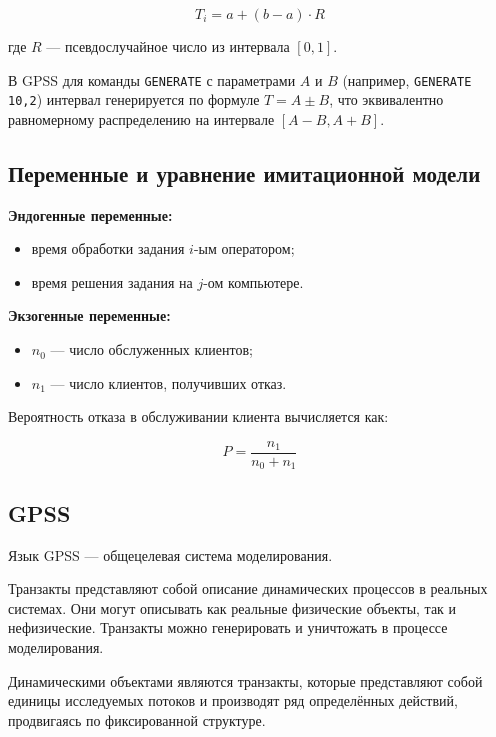 \begin{equation}
T_i = a + (b - a) \cdot R
\end{equation}

где $R$ — псевдослучайное число из интервала $[0, 1]$.

В GPSS для команды \texttt{GENERATE} с параметрами $A$ и $B$ (например, \texttt{GENERATE 10,2}) интервал генерируется по формуле $T = A \pm B$, что эквивалентно равномерному распределению на интервале $[A-B, A+B]$.

\subsection{Переменные и уравнение имитационной модели}

\textbf{Эндогенные переменные:}

\begin{itemize}
    \item время обработки задания $i$-ым оператором;
    \item время решения задания на $j$-ом компьютере.
\end{itemize}

\textbf{Экзогенные переменные:}

\begin{itemize}
    \item $n_0$ — число обслуженных клиентов;
    \item $n_1$ — число клиентов, получивших отказ.
\end{itemize}

Вероятность отказа в обслуживании клиента вычисляется как:

\begin{equation}
P = \frac{n_1}{n_0 + n_1}
\end{equation}

\subsection{GPSS}

Язык GPSS — общецелевая система моделирования.

Транзакты представляют собой описание динамических процессов в реальных системах. Они могут описывать как реальные физические объекты, так и нефизические. Транзакты можно генерировать и уничтожать в процессе моделирования.

Динамическими объектами являются транзакты, которые представляют собой единицы исследуемых потоков и производят ряд определённых действий, продвигаясь по фиксированной структуре.

